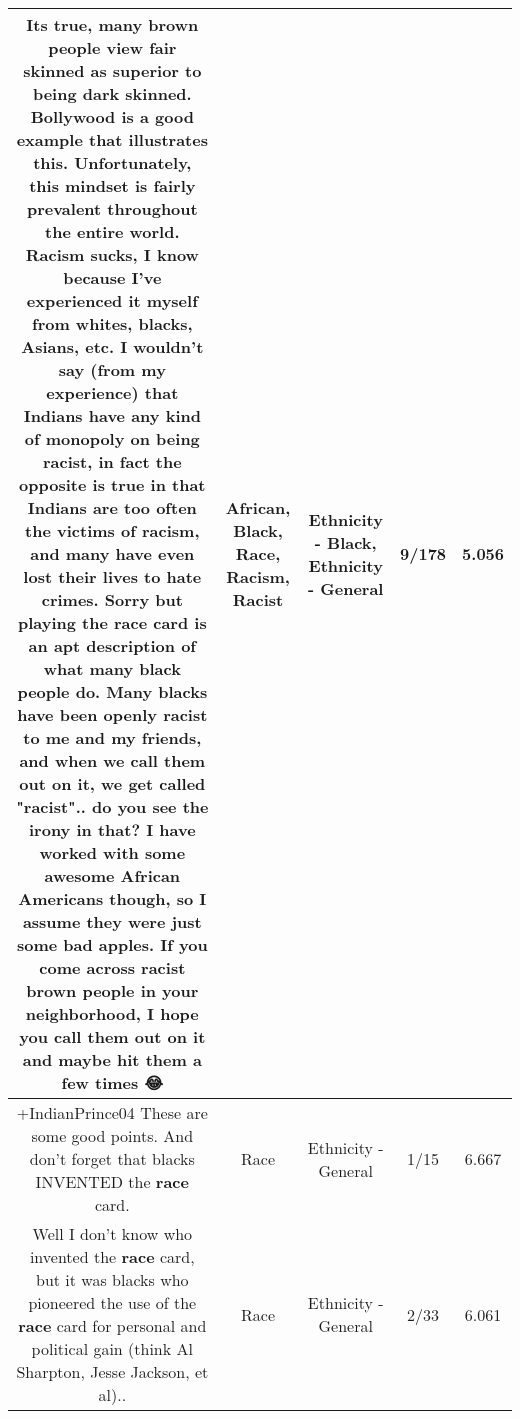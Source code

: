 \documentclass[11pt]{article}
\newlength\mylength
\begin{document}
\begin{center}
\begin{longtable}{|C{.65\mylength}|C{.30\mylength}|C{.12\mylength}|C{.12\mylength}|C{.12\mylength}|}
  \small Its true, many brown people view fair skinned as superior to being dark skinned. Bollywood is a good example that illustrates this. Unfortunately, this mindset is fairly prevalent throughout the entire world. \textbf{Racism} sucks, I know because I've experienced it myself from whites, blacks, Asians, etc. I wouldn't say (from my experience) that Indians have any kind of monopoly on being \textbf{racist}, in fact the opposite is true in that Indians are too often the victims of \textbf{racism}, and many have even lost their lives to hate crimes. Sorry but playing the \textbf{race} card is an apt description of what many \textbf{black} people do. Many blacks have been openly \textbf{racist} to me and my friends, and when we call them out on it, we get called "\textbf{racist}".. do you see the irony in that? I have worked with some awesome \textbf{African} Americans though, so I assume they were just some bad apples. If you come across \textbf{racist} brown people in your neighborhood, I hope you call them out on it and maybe hit them a few times 😂\normalsize   & African, Black, Race, Racism, Racist & Ethnicity - Black, Ethnicity - General & 9/178 & 5.056 \\  \hline
  \small +IndianPrince04 These are some good points. And don't forget that blacks INVENTED the \textbf{race} card.\normalsize   & Race & Ethnicity - General & 1/15 & 6.667 \\  \hline
  \small Well I don't know who invented the \textbf{race} card, but it was blacks who pioneered the use of the \textbf{race} card for personal and political gain (think Al Sharpton, Jesse Jackson, et al)..\normalsize   & Race & Ethnicity - General & 2/33 & 6.061 \\  \hline

\end{longtable}
\end{center}
\end{document}
